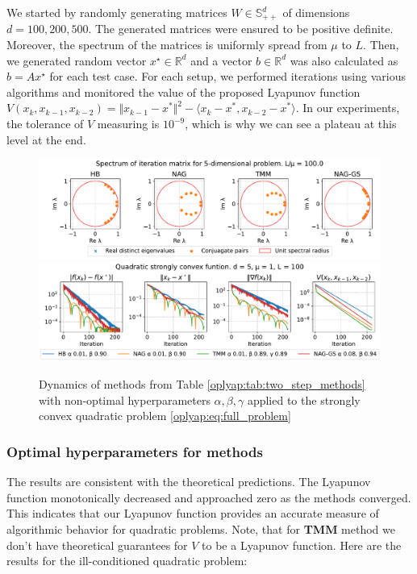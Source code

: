 \documentclass[a4paper,11pt]{article}
\begin{document}
We started by randomly generating matrices $W \in \mathbb{S}^d_{++}$ of dimensions $d=100,200,500$. The generated matrices were ensured to be positive definite. Moreover, the spectrum of the matrices is uniformly spread from $\mu$ to $L$. Then, we generated random vector $x^\star \in \mathbb{R}^d$ and a vector $b \in \mathbb{R}^d$ was also calculated as $b = Ax^\star$ for each test case. For each setup, we performed iterations using various algorithms and monitored the value of the proposed Lyapunov function $ V(x_k, x_{k-1}, x_{k-2}) = \Vert x_{k-1} - x^*\Vert^2 - \langle x_k - x^*, x_{k-2} - x^* \rangle $. In our experiments, the tolerance of $V$ measuring is $10^{-9}$, which is why we can see a plateau at this level at the end.

\begin{figure}[h!]
    \centering
    \includegraphics[width=\linewidth]{quad_simple_non_optimal_spectrum.pdf}
    \includegraphics[width=\linewidth]{quad_simple_non_optimal.pdf}
    \caption{Dynamics of methods from Table \ref{oplyap:tab:two_step_methods} with non-optimal hyperparameters $\alpha, \beta, \gamma$ applied to the strongly convex quadratic problem \eqref{oplyap:eq:full_problem}}
    \label{oplyap:fig:non_optimal}
\end{figure}

\subsubsection{Optimal hyperparameters for methods}

The results are consistent with the theoretical predictions. The Lyapunov function monotonically decreased and approached zero as the methods converged. This indicates that our Lyapunov function provides an accurate measure of algorithmic behavior for quadratic problems. Note, that for \textbf{TMM} method we don't have theoretical guarantees for $V$ to be a Lyapunov function. Here are the results for the ill-conditioned quadratic problem:
\end{document}
